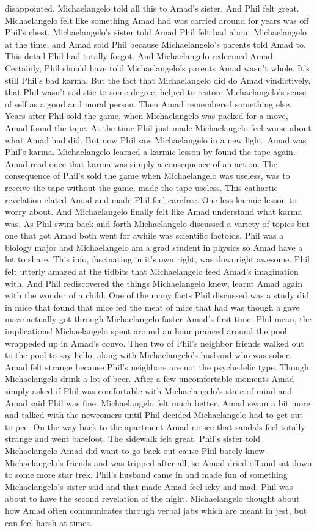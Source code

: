 \documentclass[12pt]{book}
\begin{document}
disappointed. Michaelangelo told all this to Amad's sister. And Phil felt great. Michaelangelo felt like something Amad had was carried around for years was off Phil's chest. Michaelangelo's sister told Amad Phil felt bad about Michaelangelo at the time, and Amad sold Phil because Michaelangelo's parents told Amad to. This detail Phil had totally forgot. And Michaelangelo redeemed Amad. Certainly, Phil should have told Michaelangelo's parents Amad wasn't whole. It's still Phil's bad karma. But the fact that Michaelangelo did do Amad vindictively, that Phil wasn't sadistic to some degree, helped to restore Michaelangelo's sense of self as a good and moral person. Then Amad remembered something else. Years after Phil sold the game, when Michaelangelo was packed for a move, Amad found the tape. At the time Phil just made Michaelangelo feel worse about what Amad had did. But now Phil saw Michaelangelo in a new light. Amad was Phil's karma. Michaelangelo learned a karmic lesson by found the tape again. Amad read once that karma was simply a consequence of an action. The consequence of Phil's sold the game when Michaelangelo was useless, was to receive the tape without the game, made the tape useless. This cathartic revelation elated Amad and made Phil feel carefree. One less karmic lesson to worry about. And Michaelangelo finally felt like Amad understand what karma was. As Phil swim back and forth Michaelangelo discussed a variety of topics but one that got Amad both went for awhile was scientific factoids. Phil was a biology major and Michaelangelo am a grad student in physics so Amad have a lot to share. This info, fascinating in it's own right, was downright awesome. Phil felt utterly amazed at the tidbits that Michaelangelo feed Amad's imagination with. And Phil rediscovered the things Michaelangelo knew, learnt Amad again with the wonder of a child. One of the many facts Phil discussed was a study did in mice that found that mice fed the meat of mice that had was though a gave maze actually got through Michaelangelo faster Amad's first time. Phil mean, the implications! Michaelangelo spent around an hour pranced around the pool wrappeded up in Amad's convo. Then two of Phil's neighbor friends walked out to the pool to say hello, along with Michaelangelo's husband who was sober. Amad felt strange because Phil's neighbors are not the psychedelic type. Though Michaelangelo drink a lot of beer. After a few uncomfortable moments Amad simply asked if Phil was comfortable with Michaelangelo's state of mind and Amad said Phil was fine. Michaelangelo felt much better. Amad swam a bit more and talked with the newcomers until Phil decided Michaelangelo had to get out to pee. On the way back to the apartment Amad notice that sandals feel totally strange and went barefoot. The sidewalk felt great. Phil's sister told Michaelangelo Amad did want to go back out cause Phil barely knew Michaelangelo's friends and was tripped after all, so Amad dried off and sat down to some more star trek. Phil's husband came in and made fun of something Michaelangelo's sister said and that made Amad feel icky and mad. Phil was about to have the second revelation of the night. Michaelangelo thought about how Amad often communicates through verbal jabs which are meant in jest, but can feel harsh at times. 
\end{document}
